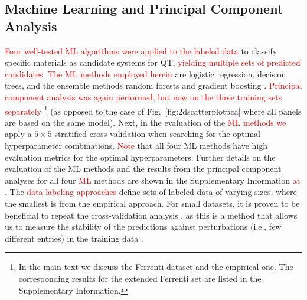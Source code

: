 \documentclass[superscriptaddress,unsortedaddress,
 amsmath,amssymb,
 aps,
]{revtex4-2}
\newcommand{\mrk}[1]{\textcolor{red}{#1}}
\begin{document}

\subsection*{Machine Learning and Principal Component Analysis}
\mrk{Four well-tested ML algorithms were applied to the labeled data} to classify specific materials as candidate systems for QT\mrk{, yielding multiple sets of predicted candidates. The ML methods employed herein} are logistic regression, decision trees, and the ensemble methods random forests and gradient boosting \cite{Mehta2019,Hastie2009,Murphy2012}. 
\mrk{Principal component analysis was again performed, but now on the three training sets separately} \footnote{In the main text we discuss the Ferrenti dataset and the empirical one. The corresponding results for the extended Ferrenti set are listed in the Supplementary Information.}
(as opposed to the case of Fig.~\ref{fig:2dscatterplotpca} where all panels are based on the same model). 
Next, in the evaluation of the \mrk{ML methods we}  
apply a $5\times 5$ stratified cross-validation \cite{Hastie2009} when searching for the optimal hyperparameter combinations. \mrk{Note} that all four ML methods have high evaluation metrics for the optimal hyperparameters. Further details on the evaluation of the ML methods and the results from the principal component analyses for all four \mrk{ML} methods are shown in the Supplementary Information \mrk{at} \cite{supplementary}.  
The \mrk{data labeling approaches} define sets of labeled data of varying sizes, where the smallest is from the empirical approach. For small datasets, it is proven to be beneficial to repeat the cross-validation analysis \cite{Hastie2009}, as this is a method that allows us to measure the stability of the predictions against perturbations (i.e., few different entries) in the training data \cite{Beleites2008}.
\end{document}
